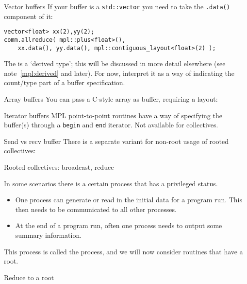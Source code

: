 \begin{mplnote}{Vector buffers}
  \label{mpl:vec-buf}
If your buffer is a \lstinline+std::vector+ you need
to take the \lstinline+.data()+ component of it:
\begin{lstlisting}
vector<float> xx(2),yy(2);
comm.allreduce( mpl::plus<float>(),
    xx.data(), yy.data(), mpl::contiguous_layout<float>(2) );
\end{lstlisting}
  The  is a `derived type';
this will be discussed in more detail elsewhere
(see note~\ref{mpl:derived} and later).
For now, interpret it as a way of indicating the count/type
part of a buffer specification.
\end{mplnote}

\begin{mplnote}{Array buffers}
  \label{mpl:vec-arr}
  You can pass a C-style array as buffer, requiring a layout:
\end{mplnote}

\begin{mplnote}{Iterator buffers}
  \label{mpl:buf-itr}
  MPL point-to-point routines have a way of specifying the buffer(s)
  through a \lstinline{begin} and \lstinline{end} iterator.
  Not available for collectives.
\end{mplnote}

\begin{mplnote}{Send vs recv buffer}
  There is a separate variant for non-root usage of rooted collectives:
\end{mplnote}

 {Rooted collectives: broadcast, reduce}
\label{sec:rooted}

In some scenarios there is a certain process that has a privileged status.
\begin{itemize}
\item
  One process can generate or read in the initial data for a program
  run. This then needs to be communicated to all other processes.
\item
  At the end of a program run, often
  one process needs to output some summary information.
\end{itemize}
This process is called the  process, and we will now
consider routines that have a root.

 {Reduce to a root}
\label{sec:reduce-root}

